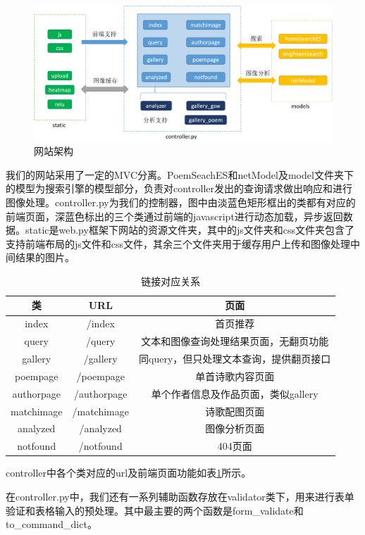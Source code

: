 \documentclass[a4paper, 10pt]{article}
\begin{document}
\begin{figure}[H]
\centering
\includegraphics[scale=0.48]{fig/web_struct.png}
\caption{网站架构}
\label{fig:web_struct}
\end{figure}

我们的网站采用了一定的MVC分离。PoemSeachES和netModel及model文件夹下的模型为搜索引擎的模型部分，负责对controller发出的查询请求做出响应和进行图像处理。controller.py为我们的控制器，图中由淡蓝色矩形框出的类都有对应的前端页面，深蓝色标出的三个类通过前端的javascript进行动态加载，异步返回数据。static是web.py框架下网站的资源文件夹，其中的js文件夹和css文件夹包含了支持前端布局的js文件和css文件，其余三个文件夹用于缓存用户上传和图像处理中间结果的图片。

\begin{table}[H]
\centering
\begin{tabular}{ccc}
\hline
\textbf{类} & \textbf{URL} & \textbf{页面} \\ \hline
index & /index & 首页推荐 \\
query & /query & 文本和图像查询处理结果页面，无翻页功能 \\ 
gallery & /gallery & 同query，但只处理文本查询，提供翻页接口 \\ 
poempage & /poempage & 单首诗歌内容页面 \\ 
authorpage & /authorpage & 单个作者信息及作品页面，类似gallery \\ 
matchimage & /matchimage & 诗歌配图页面 \\ 
analyzed & /analyzed & 图像分析页面 \\ 
notfound & /notfound & 404页面 \\ \hline
\end{tabular}
\caption{链接对应关系}
\label{tab:url_connect}
\end{table}

controller中各个类对应的url及前端页面功能如表\ref{tab:url_connect}所示。

在controller.py中，我们还有一系列辅助函数存放在validator类下，用来进行表单验证和表格输入的预处理。其中最主要的两个函数是form\_validate和to\_command\_dict。
\end{document}
